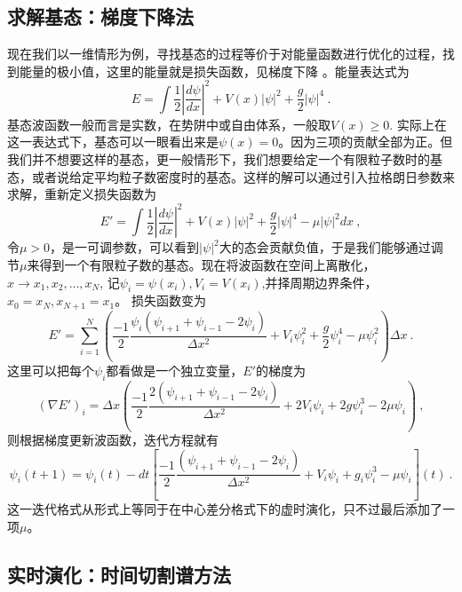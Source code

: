\subsection{求解基态：梯度下降法}
现在我们以一维情形为例，寻找基态的过程等价于对能量函数进行优化的过程，找到能量的极小值，这里的能量就是损失函数，见梯度下降 。能量表达式为
\begin{equation}
E = \int \frac{1}{2}|\frac{d \psi}{dx}|^2 + V(x)|\psi|^2 + \frac{g}{2}|\psi|^4~.
\end{equation}
基态波函数一般而言是实数，在势阱中或自由体系，一般取$V(x)\ge 0$. 实际上在这一表达式下，基态可以一眼看出来是$\psi(x) = 0$。因为三项的贡献全部为正。但我们并不想要这样的基态，更一般情形下，我们想要给定一个有限粒子数时的基态，或者说给定平均粒子数密度时的基态。这样的解可以通过引入拉格朗日参数来求解，重新定义损失函数为
\begin{equation}
E' = \int \frac{1}{2}|\frac{d\psi}{dx}|^2 + V(x)|\psi|^2 + \frac{g}{2}|\psi|^4 -\mu |\psi|^2 dx ~,
\end{equation}
令$\mu>0$，是一可调参数，可以看到$|\psi|^2$大的态会贡献负值，于是我们能够通过调节$\mu$来得到一个有限粒子数的基态。现在将波函数在空间上离散化，$x\rightarrow x_1,x_2,...,x_N$, 记$\psi_i = \psi(x_i),V_i = V(x_i)$,并择周期边界条件，$x_0 = x_N, x_{N+1}= x_1$。 损失函数变为
\begin{equation}
E' =\sum_{i=1}^N (\frac{-1}{2} \frac{\psi_i(\psi_{i+1}+\psi_{i-1}-2\psi_i)}{\Delta x^2} + V_i\psi_{i}^2 + \frac{g}{2}\psi_i^4 - \mu \psi_i^2) \Delta x~.
\end{equation}
这里可以把每个$\psi_i$都看做是一个独立变量，$E'$的梯度为
\begin{equation}
(\nabla E')_i = \Delta x (\frac{-1}{2}\frac{2(\psi_{i+1}+\psi_{i-1}-2\psi_i)}{\Delta x^2} + 2V_i \psi_i + 2g \psi_i^3 - 2\mu \psi_i ) ~,
\end{equation}
则根据梯度更新波函数，迭代方程就有
\begin{equation}
\psi_i(t+1) = \psi_i(t) -dt [\frac{-1}{2}\frac{(\psi_{i+1} +\psi_{i-1}-2\psi_i )}{\Delta x^2} + V_i \psi_i + g_i \psi_i^3 -\mu \psi_i](t) ~.
\end{equation}
这一迭代格式从形式上等同于在中心差分格式下的虚时演化，只不过最后添加了一项$\mu$。

\subsection{实时演化：时间切割谱方法}

